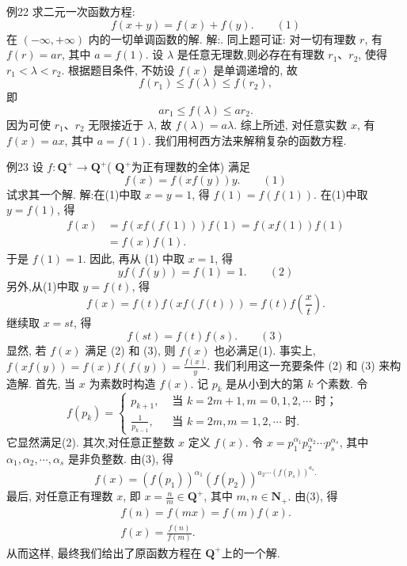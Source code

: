 例22 求二元一次函数方程:
$$
f(x+y)=f(x)+f(y) . \quad\quad (1)
$$
在 $(-\infty,+\infty)$ 内的一切单调函数的解.
解:.
同上题可证: 对一切有理数 $r$, 有 $f(r)=a r$, 其中 $a=f(1)$. 设 $\lambda$ 是任意无理数,则必存在有理数 $r_1 、 r_2$, 使得 $r_1<\lambda<r_2$.
根据题目条件, 不妨设 $f(x)$ 是单调递增的, 故
$$
f\left(r_1\right) \leqslant f(\lambda) \leqslant f\left(r_2\right),
$$
即
$$
a r_1 \leqslant f(\lambda) \leqslant a r_2 .
$$
因为可使 $r_1 、 r_2$ 无限接近于 $\lambda$, 故 $f(\lambda)=a \lambda$.
综上所述, 对任意实数 $x$, 有 $f(x)=a x$, 其中 $a=f(1)$.
我们用柯西方法来解稍复杂的函数方程.



例23 设 $f: \mathbf{Q}^{+} \rightarrow \mathbf{Q}^{+}$( $\mathbf{Q}^{+}$为正有理数的全体) 满足
$$
f(x)=f(x f(y)) y . \quad\quad (1)
$$
试求其一个解.
解:在(1)中取 $x=y=1$, 得 $f(1)=f(f(1))$.
在(1)中取 $y=f(1)$, 得
$$
\begin{aligned}
f(x) & =f(x f(f(1))) f(1)=f(x f(1)) f(1) \\
& =f(x) f(1) .
\end{aligned}
$$
于是 $f(1)=1$. 因此, 再从 (1) 中取 $x=1$, 得
$$
y f(f(y))=f(1)=1 . \quad\quad (2)
$$
另外,从(1)中取 $y=f(t)$, 得
$$
f(x)=f(t) f(x f(f(t)))=f(t) f\left(\frac{x}{t}\right) .
$$
继续取 $x=s t$, 得
$$
f(s t)=f(t) f(s) . \quad\quad (3)
$$
显然, 若 $f(x)$ 满足 (2) 和 (3), 则 $f(x)$ 也必满足(1). 事实上, $f(x f(y))=f(x) f(f(y))=\frac{f(x)}{y}$. 我们利用这一充要条件 (2) 和 (3) 来构造解.
首先, 当 $x$ 为素数时构造 $f(x)$. 记 $p_k$ 是从小到大的第 $k$ 个素数.
令
$$
f\left(p_k\right)= \begin{cases}p_{k+1}, & \text { 当 } k=2 m+1, m=0,1,2, \cdots \text { 时； } \\ \frac{1}{p_{k-1}}, & \text { 当 } k=2 m, m=1,2, \cdots \text { 时.
}\end{cases}
$$
它显然满足(2).
其次,对任意正整数 $x$ 定义 $f(x)$. 令 $x=p_1^{\alpha_1} p_2^{\alpha_2} \cdots p_s^{\alpha_s}$, 其中 $\alpha_1, \alpha_2, \cdots, \alpha_s$ 是非负整数.
由(3), 得
$$
f(x)=\left(f\left(p_1\right)\right)^{\alpha_1}\left(f\left(p_2\right)\right)^{a_2 \cdots\left(f\left(p_s\right)\right)^{a_s} .} 
$$
最后, 对任意正有理数 $x$, 即 $x=\frac{n}{m} \in \mathbf{Q}^{+}$, 其中 $m, n \in \mathbf{N}_{+}$.
由(3), 得
$$
\begin{gathered}
f(n)=f(m x)=f(m) f(x) . \\
f(x)=\frac{f(n)}{f(m)} .
\end{gathered}
$$
从而这样, 最终我们给出了原函数方程在 $\mathbf{Q}^{+}$上的一个解.



